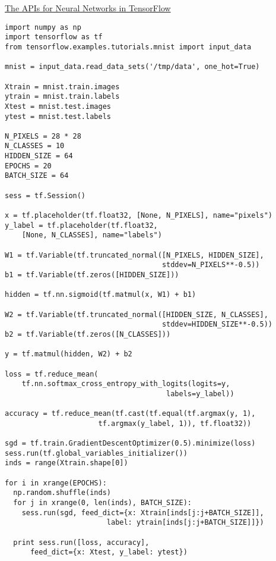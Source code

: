 \documentclass[landscape]{slides}
\begin{document}
\begin{slide}
\href{https://blog.thedataincubator.com/2017/09/the-apis-for-neural-networks-in-tensorflow/}{The APIs for Neural Networks in TensorFlow}

\begin{verbatim}
import numpy as np
import tensorflow as tf
from tensorflow.examples.tutorials.mnist import input_data

mnist = input_data.read_data_sets('/tmp/data', one_hot=True)

Xtrain = mnist.train.images
ytrain = mnist.train.labels
Xtest = mnist.test.images
ytest = mnist.test.labels

N_PIXELS = 28 * 28
N_CLASSES = 10
HIDDEN_SIZE = 64
EPOCHS = 20
BATCH_SIZE = 64

sess = tf.Session()

x = tf.placeholder(tf.float32, [None, N_PIXELS], name="pixels")
y_label = tf.placeholder(tf.float32,
    [None, N_CLASSES], name="labels")

W1 = tf.Variable(tf.truncated_normal([N_PIXELS, HIDDEN_SIZE],
                                     stddev=N_PIXELS**-0.5))
b1 = tf.Variable(tf.zeros([HIDDEN_SIZE]))

hidden = tf.nn.sigmoid(tf.matmul(x, W1) + b1)

W2 = tf.Variable(tf.truncated_normal([HIDDEN_SIZE, N_CLASSES],
                                     stddev=HIDDEN_SIZE**-0.5))
b2 = tf.Variable(tf.zeros([N_CLASSES]))

y = tf.matmul(hidden, W2) + b2

loss = tf.reduce_mean(
    tf.nn.softmax_cross_entropy_with_logits(logits=y,
                                      labels=y_label))

accuracy = tf.reduce_mean(tf.cast(tf.equal(tf.argmax(y, 1),
                      tf.argmax(y_label, 1)), tf.float32))

sgd = tf.train.GradientDescentOptimizer(0.5).minimize(loss)
sess.run(tf.global_variables_initializer())
inds = range(Xtrain.shape[0])

for i in xrange(EPOCHS):
  np.random.shuffle(inds)
  for j in xrange(0, len(inds), BATCH_SIZE):
    sess.run(sgd, feed_dict={x: Xtrain[inds[j:j+BATCH_SIZE]],
                        label: ytrain[inds[j:j+BATCH_SIZE]]})
    
  print sess.run([loss, accuracy],
      feed_dict={x: Xtest, y_label: ytest})

\end{verbatim}
\end{slide}
\end{document}
